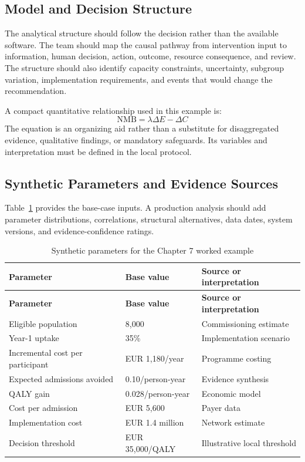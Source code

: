 \subsection{Model and Decision Structure}
The analytical structure should follow the decision rather than the available
software. The team should map the causal pathway from intervention input to
information, human decision, action, outcome, resource consequence, and review.
The structure should also identify capacity constraints, uncertainty, subgroup
variation, implementation requirements, and events that would change the
recommendation.

A compact quantitative relationship used in this example is:
\begin{equation}
\mathrm{NMB}=\lambda\Delta E-\Delta C
\label{eq:comp-ch07-key-relationship}
\end{equation}
The equation is an organizing aid rather than a substitute for disaggregated evidence,
qualitative findings, or mandatory safeguards. Its variables and interpretation must
be defined in the local protocol.

\subsection{Synthetic Parameters and Evidence Sources}
Table~\ref{tab:comp-ch07-parameters} provides the base-case inputs. A
production analysis should add parameter distributions, correlations, structural
alternatives, data dates, system versions, and evidence-confidence ratings.

\begin{longtable}{@{}p{}p{}p{}@{}}
\caption{Synthetic parameters for the Chapter 7 worked example}
\label{tab:comp-ch07-parameters}\\
\toprule
\textbf{Parameter} & \textbf{Base value} & \textbf{Source or interpretation} \\
\midrule
\endfirsthead
\toprule
\textbf{Parameter} & \textbf{Base value} & \textbf{Source or interpretation} \\
\midrule
\endhead
\bottomrule
\endlastfoot
Eligible population & 8,000 & Commissioning estimate \\
Year-1 uptake & 35\% & Implementation scenario \\
Incremental cost per participant & EUR 1,180/year & Programme costing \\
Expected admissions avoided & 0.10/person-year & Evidence synthesis \\
QALY gain & 0.028/person-year & Economic model \\
Cost per admission & EUR 5,600 & Payer data \\
Implementation cost & EUR 1.4 million & Network estimate \\
Decision threshold & EUR 35,000/QALY & Illustrative local threshold \\
\end{longtable}

